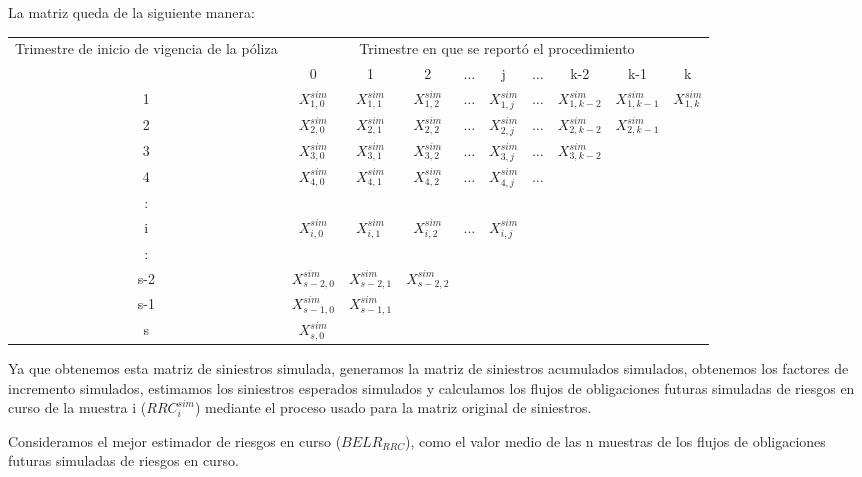 \documentclass[11pt,twoside,openright,spanish]{report}
\numberwithin{equation}{chapter}
\numberwithin{figure}{chapter}
\numberwithin{table}{chapter}
\begin{document}
	La matriz queda de la siguiente manera:
	
	\begin{table}[H]
		\centering
	
		\begin{tabularx}{\linewidth}{ c|ccccccccc}
			\multirow{2}{4cm}{Trimestre de inicio de vigencia de la póliza}& \multicolumn{9}{c}{Trimestre en que se reportó el procedimiento} \\
			& 0  & 1 & 2 & $ \dots $ & j & $\dots $ & k-2 & k-1 &  k \\
			\midrule
			1      &  $X_{1,0}^{sim}$ & $X_{1,1}^{sim}$ & $X_{1,2}^{sim}$ & $ \dots $ & $X_{1,j}^{sim}$ & $ \dots $ & $X_{1,k-2}^{sim}$ & $X_{1,k-1}^{sim}$ & $X_{1,k}^{sim}$ \\
			2      &  $X_{2,0}^{sim}$ & $X_{2,1}^{sim}$ & $X_{2,2}^{sim}$ & $ \dots $ & $X_{2,j}^{sim}$ & $ \dots $ & $X_{2,k-2}^{sim}$ & $X_{2,k-1}^{sim}$ & \\
			3      &  $X_{3,0}^{sim}$ & $X_{3,1}^{sim}$ & $X_{3,2}^{sim}$ & $ \dots $ & $X_{3,j}^{sim}$ & $ \dots $ & $X_{3,k-2}^{sim}$ & & \\
			4      &  $X_{4,0}^{sim}$ & $X_{4,1}^{sim}$ & $X_{4,2}^{sim}$ & $ \dots $ & $X_{4,j}^{sim}$ & $ \dots $ & & & \\
			:      & & & & & & & & &\\
			i      &  $X_{i,0}^{sim}$ & $X_{i,1}^{sim}$ & $X_{i,2}^{sim}$ & $ \dots $ & $X_{i,j}^{sim}$ & & & & \\
			:      & & & & & & & & & \\
			s-2      &  $X_{s-2,0}^{sim}$ & $X_{s-2,1}^{sim}$ & $X_{s-2,2}^{sim}$ & & & & & & \\
			s-1      &  $X_{s-1,0}^{sim}$ & $X_{s-1,1}^{sim}$ & & & & & & & \\
			s      &  $X_{s,0}^{sim}$ & & & & & & & & \\
		\end{tabularx}
	\end{table}

Ya que obtenemos esta matriz de siniestros simulada, generamos la matriz de siniestros acumulados simulados, obtenemos los factores de incremento simulados, estimamos los siniestros esperados simulados y calculamos los flujos de obligaciones futuras simuladas de riesgos en curso de la muestra i ($RRC_{i}^{sim}$) mediante el proceso usado para la matriz original de siniestros.
	
	 
	
	Consideramos el mejor estimador de riesgos en curso ($BELR_{RRC}$), como el valor medio de las n muestras de los flujos de obligaciones futuras simuladas de riesgos en curso.
\end{document}
